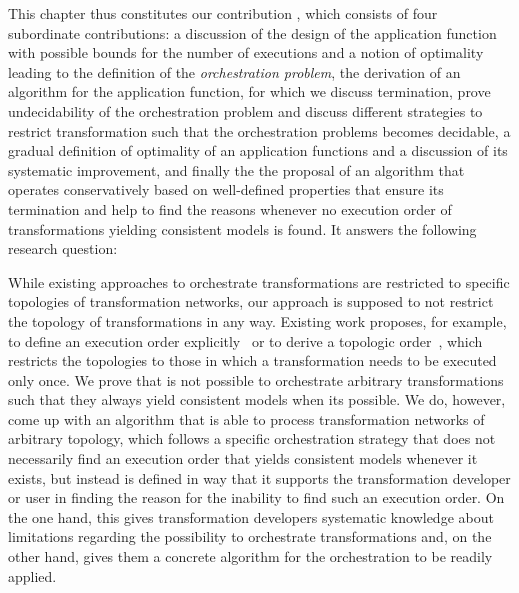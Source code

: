 This chapter thus constitutes our contribution , which consists of four subordinate contributions:
a discussion of the design of the application function with possible bounds for the number of executions and a notion of optimality leading to the definition of the \emph{orchestration problem}, the derivation of an algorithm for the application function, for which we discuss termination, prove undecidability of the orchestration problem and discuss different strategies to restrict transformation such that the orchestration problems becomes decidable, a gradual definition of optimality of an application functions and a discussion of its systematic improvement, and finally the the proposal of an algorithm that operates conservatively based on well-defined properties that ensure its termination and help to find the reasons whenever no execution order of transformations yielding consistent models is found.
It answers the following research question:


While existing approaches to orchestrate transformations are restricted to specific topologies of transformation networks, our approach is supposed to not restrict the topology of transformations in any way.
Existing work proposes, for example, to define an execution order explicitly~\cite{pilgrim2008a, vanhooff2007UniTI-MODELS} or to derive a topologic order~\cite{stevens2020BidirectionalTransformationLarge-SoSym}, which restricts the topologies to those in which a transformation needs to be executed only once.
We prove that is not possible to orchestrate arbitrary transformations such that they always yield consistent models when its possible.
We do, however, come up with an algorithm that is able to process transformation networks of arbitrary topology, which follows a specific orchestration strategy that does not necessarily find an execution order that yields consistent models whenever it exists, but instead is defined in way that it supports the transformation developer or user in finding the reason for the inability to find such an execution order.
On the one hand, this gives transformation developers systematic knowledge about limitations regarding the possibility to orchestrate transformations and, on the other hand, gives them a concrete algorithm for the orchestration to be readily applied.

